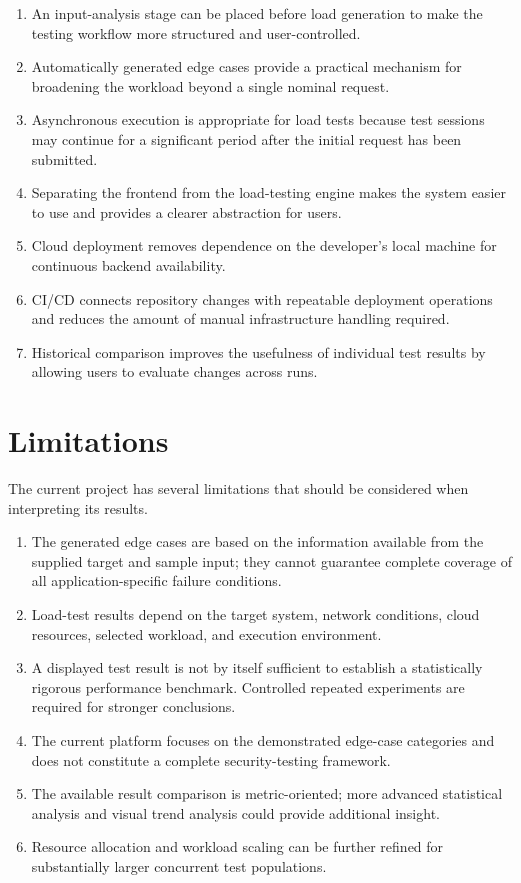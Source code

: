 \documentclass{tietreport}
\begin{document}
\begin{enumerate}
    \item An input-analysis stage can be placed before load generation to make the testing workflow more structured and user-controlled.
    \item Automatically generated edge cases provide a practical mechanism for broadening the workload beyond a single nominal request.
    \item Asynchronous execution is appropriate for load tests because test sessions may continue for a significant period after the initial request has been submitted.
    \item Separating the frontend from the load-testing engine makes the system easier to use and provides a clearer abstraction for users.
    \item Cloud deployment removes dependence on the developer's local machine for continuous backend availability.
    \item CI/CD connects repository changes with repeatable deployment operations and reduces the amount of manual infrastructure handling required.
    \item Historical comparison improves the usefulness of individual test results by allowing users to evaluate changes across runs.
\end{enumerate}

\section{Limitations}

The current project has several limitations that should be considered when interpreting its results.

\begin{enumerate}
    \item The generated edge cases are based on the information available from the supplied target and sample input; they cannot guarantee complete coverage of all application-specific failure conditions.
    \item Load-test results depend on the target system, network conditions, cloud resources, selected workload, and execution environment.
    \item A displayed test result is not by itself sufficient to establish a statistically rigorous performance benchmark. Controlled repeated experiments are required for stronger conclusions.
    \item The current platform focuses on the demonstrated edge-case categories and does not constitute a complete security-testing framework.
    \item The available result comparison is metric-oriented; more advanced statistical analysis and visual trend analysis could provide additional insight.
    \item Resource allocation and workload scaling can be further refined for substantially larger concurrent test populations.
\end{enumerate}
\end{document}
